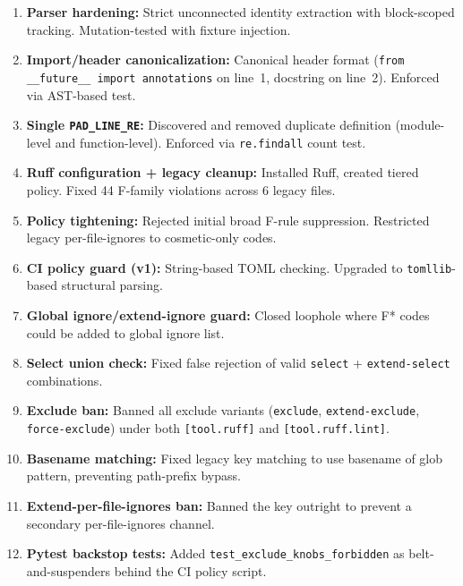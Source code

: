 \documentclass[11pt,a4paper]{article}
\begin{document}
\begin{enumerate}
    \item \textbf{Parser hardening:} Strict unconnected identity extraction with
          block-scoped tracking. Mutation-tested with fixture injection.
    \item \textbf{Import/header canonicalization:} Canonical header format
          (\texttt{from \_\_future\_\_ import annotations} on line~1, docstring
          on line~2). Enforced via AST-based test.
    \item \textbf{Single \texttt{PAD\_LINE\_RE}:} Discovered and removed duplicate
          definition (module-level and function-level). Enforced via
          \texttt{re.findall} count test.
    \item \textbf{Ruff configuration + legacy cleanup:} Installed Ruff, created
          tiered policy. Fixed 44 F-family violations across 6 legacy files.
    \item \textbf{Policy tightening:} Rejected initial broad F-rule suppression.
          Restricted legacy per-file-ignores to cosmetic-only codes.
    \item \textbf{CI policy guard (v1):} String-based TOML checking. Upgraded to
          \texttt{tomllib}-based structural parsing.
    \item \textbf{Global ignore/extend-ignore guard:} Closed loophole where F*
          codes could be added to global ignore list.
    \item \textbf{Select union check:} Fixed false rejection of valid
          \texttt{select} + \texttt{extend-select} combinations.
    \item \textbf{Exclude ban:} Banned all exclude variants (\texttt{exclude},
          \texttt{extend-exclude}, \texttt{force-exclude}) under both
          \texttt{[tool.ruff]} and \texttt{[tool.ruff.lint]}.
    \item \textbf{Basename matching:} Fixed legacy key matching to use basename
          of glob pattern, preventing path-prefix bypass.
    \item \textbf{Extend-per-file-ignores ban:} Banned the key outright to
          prevent a secondary per-file-ignores channel.
    \item \textbf{Pytest backstop tests:} Added \texttt{test\_exclude\_knobs\_forbidden}
          as belt-and-suspenders behind the CI policy script.
\end{enumerate}

\end{document}

